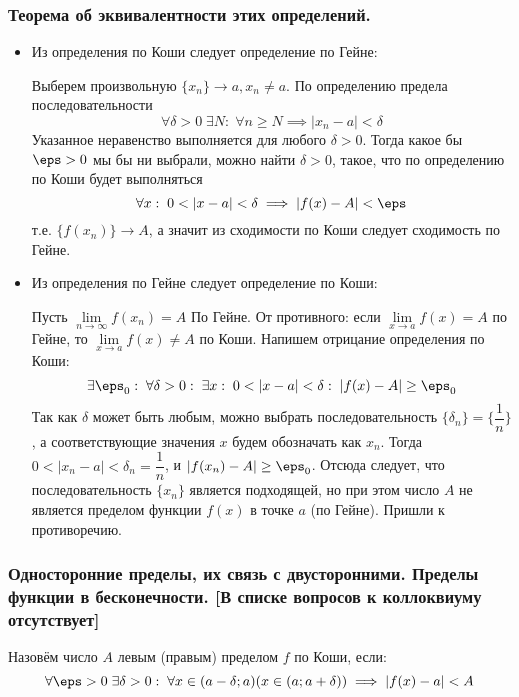 \documentclass[12pt, a4paper]{article}
\begin{document}
	\subsubsection{Теорема об эквивалентности этих определений.} 
	\begin{itemize}
		\item
		Из определения по Коши следует определение по Гейне:

		Выберем произвольную $\{x_n\} \to a, x_n \neq a$. По определению предела последовательности 
		\begin{equation*}
			\forall \delta > 0 \; \exists N: \; \forall n \geq N \implies |x_n - a| < \delta
		\end{equation*}
		Указанное неравенство выполняется для любого $\delta > 0$. Тогда какое бы $\eps > 0$ мы бы ни выбрали, можно найти $\delta > 0$, такое, что по определению по Коши будет выполняться
		\begin{equation*}
			\forall x: \; 0 < |x - a| < \delta \implies |f(x) - A| < \eps
		\end{equation*}
		т.е. $\{f(x_n)\} \to A$, а значит из сходимости по Коши следует сходимость по Гейне.

		\item
		Из определения по Гейне следует определение по Коши:

		Пусть $\lim\limits_{n \to \infty} f(x_n) = A$ По Гейне. От противного: если $\lim\limits_{x \to a} f(x) = A$ по Гейне, то $\lim\limits_{x \to a} f(x) \neq A$ по Коши. Напишем отрицание определения по Коши:
		\begin{equation*}
			\exists \eps_0: \; \forall \delta > 0: \; \exists x: \; 0 < |x - a| < \delta: \; |f(x) - A| \geq \eps_0
		\end{equation*}
		Так как $\delta$ может быть любым, можно выбрать последовательность $\{\delta_n\} = \{\dfrac{1}{n}\}$, а соответствующие значения $x$ будем обозначать как $x_n$. Тогда $0 < |x_n - a| < \delta_n = \dfrac{1}{n}$, и $|f(x_n) - A| \geq \eps_0$. Отсюда следует, что последовательность $\{x_n\}$ является подходящей, но при этом число $A$ не является пределом функции $f(x)$ в точке $a$ (по Гейне). Пришли к противоречию.
	\end{itemize}

	\subsubsection{Односторонние пределы, их связь с двусторонними. Пределы функции в бесконечности. [В списке вопросов к коллоквиуму отсутствует]}
	Назовём число $A$ левым (правым) пределом $f$ по Коши, если:
	\begin{equation*}
		\forall \eps > 0 \; \exists \delta > 0: \; \forall x \in (a - \delta; a) (x \in (a; a + \delta)) \implies |f(x) - a| < A
	\end{equation*}
\end{document}
